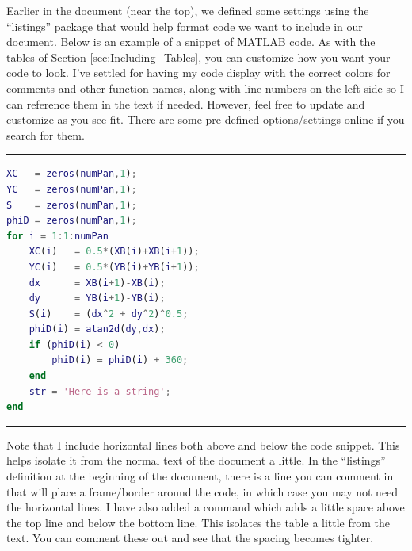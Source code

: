 \documentclass[letterpaper,12pt]{article}
\begin{document}
Earlier in the document (near the top), we defined some settings using the ``listings'' package that would help format code we want to include in our document.  Below is an example of a snippet of MATLAB code.  As with the tables of Section \ref{sec:Including_Tables}, you can customize how you want your code to look.  I've settled for having my code display with the correct colors for comments and other function names, along with line numbers on the left side so I can reference them in the text if needed.  However, feel free to update and customize as you see fit.  There are some pre-defined options/settings online if you search for them.

\vspace{1em}
\par\noindent\rule{\textwidth}{0.4pt}

\lstset{basicstyle=\small}
\begin{lstlisting}[language=MATLAB]
% Find geometric quantities of airfoil
XC   = zeros(numPan,1);
YC   = zeros(numPan,1);
S    = zeros(numPan,1);
phiD = zeros(numPan,1);
for i = 1:1:numPan
    XC(i)   = 0.5*(XB(i)+XB(i+1));
    YC(i)   = 0.5*(YB(i)+YB(i+1));
    dx      = XB(i+1)-XB(i);
    dy      = YB(i+1)-YB(i);
    S(i)    = (dx^2 + dy^2)^0.5;
	phiD(i) = atan2d(dy,dx);
    if (phiD(i) < 0)
        phiD(i) = phiD(i) + 360;
    end
    str = 'Here is a string';
end
\end{lstlisting}

\par\noindent\rule{\textwidth}{0.4pt}
\vspace{1em}

Note that I include horizontal lines both above and below the code snippet.  This helps isolate it from the normal text of the document a little.  In the ``listings'' definition at the beginning of the document, there is a line you can comment in that will place a frame/border around the code, in which case you may not need the horizontal lines.  I have also added a command which adds a little space above the top line and below the bottom line.  This isolates the table a little from the text.  You can comment these out and see that the spacing becomes tighter.

\end{document}
